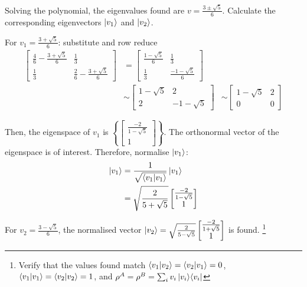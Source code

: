 \begin{enumerate}
        Solving the polynomial, the eigenvalues found are $v = \frac{3 \pm \sqrt5}{6}$.
        Calculate the corresponding eigenvectors $\ket{v_1}$ and $\ket{v_2}$.
        
        For $v_1 = \frac{3 + \sqrt5}{6}$: substitute and row reduce
        \begin{align}
            \left[ \begin{matrix}
            \frac{4}{6} - \frac{3 + \sqrt5}{6} & \frac{1}{3} \\
            \frac{1}{3} & \frac{2}{6} - \frac{3 + \sqrt5}{6}
            \end{matrix} \right]
            &=
            \left[ \begin{matrix}
            \frac{1 - \sqrt5}{6} & \frac{1}{3} \\
            \frac{1}{3} & \frac{-1 - \sqrt5}{6}
            \end{matrix} \right] \\
            &\sim \left[ \begin{matrix}
                1 - \sqrt5 & 2 \\ 2 & -1 -\sqrt5 \end{matrix} \right]
            &\sim \left[ \begin{matrix}
                1 - \sqrt5 & 2 \\ 0 & 0 \end{matrix} \right]
        \end{align}
        
        Then, the eigenspace of $v_1$ is
        $\left\{ \left[ \begin{matrix} \frac{-2}{1 - \sqrt5} \\
        1 \end{matrix} \right] \right\}$.
        The orthonormal vector of the eigenspace is of interest.
        Therefore, normalise $\ket{v_1}$:
        \begin{align}
            \ket{v_1} &= \frac{1}{\sqrt{\mathop{\mathinner{ \langle{v_1}|{v_1}\rangle}}}} \ket{v_1} \\
            &= \sqrt{\frac{2}{5 + \sqrt5}} \left[ \begin{matrix}
                \frac{-2}{1 - \sqrt5} \\ 1 \end{matrix} \right]
        \end{align}
        
        For $v_2 = \frac{3 - \sqrt5}{6}$, the normalised vector
        $\ket{v_2} = \sqrt{\frac{2}{5 - \sqrt5}} \left[ \begin{matrix}
                \frac{-2}{1 + \sqrt5} \\ 1 \end{matrix} \right]$
        is found.
        \footnote{Verify that the values found match
            $\mathop{\mathinner{ \langle{v_1}|{v_2}\rangle}} = \mathop{\mathinner{ \langle{v_2}|{v_1}\rangle}} = 0$,
            $\mathop{\mathinner{ \langle{v_1}|{v_1}\rangle}} = \mathop{\mathinner{ \langle{v_2}|{v_2}\rangle}} = 1$,
            and $\rho^A = \rho^B = \sum_i v_i \mathop{\mathinner{ |{v_i}\rangle \langle{v_i}|}}$}


\end{enumerate}
